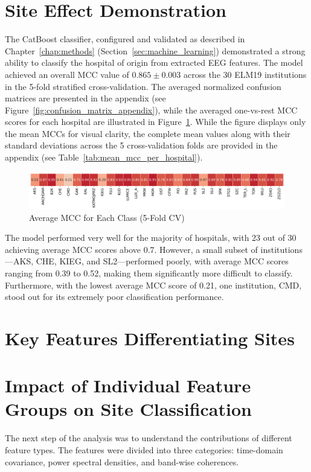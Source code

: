 \documentclass{bachelor2025eng}
\begin{document}
    \section{Site Effect Demonstration}
        The CatBoost classifier, configured and validated as described in Chapter~\ref{chap:methods} (Section~\ref{sec:machine_learning}) demonstrated a strong ability to classify the hospital of origin from extracted EEG features. The model achieved an overall MCC value of \({0.865 \pm 0.003}\) across the 30 ELM19 institutions in the 5-fold stratified cross-validation. The averaged normalized confusion matrices are presented in the appendix (see Figure~\ref{fig:confusion_matrix_appendix}), while the averaged one-vs-rest MCC scores for each hospital are illustrated in Figure~\ref{fig:hospital_classification_mcc_all_features}. While the figure displays only the mean MCCs for visual clarity, the complete mean values along with their standard deviations across the 5 cross-validation folds are provided in the appendix (see Table~\ref{tab:mean_mcc_per_hospital}).

        \begin{figure}[htbp]
        \centering
        \includegraphics[width=\textwidth]{results/hospital_classification_avg_mcc_per_class.png}
        \caption{Average MCC for Each Class (5-Fold CV)}
        \label{fig:hospital_classification_mcc_all_features}
        \end{figure}

        The model performed very well for the majority of hospitals, with 23 out of 30 achieving average MCC scores above 0.7. However, a small subset of institutions—AKS, CHE, KIEG, and SL2—performed poorly, with average MCC scores ranging from 0.39 to 0.52, making them significantly more difficult to classify. Furthermore, with the lowest average MCC score of 0.21, one institution, CMD, stood out for its extremely poor classification performance.

    \section{Key Features Differentiating Sites}
        
    \section{Impact of Individual Feature Groups on Site Classification}        
        The next step of the analysis was to understand the contributions of different feature types. The features were divided into three categories: time-domain covariance, power spectral densities, and band-wise coherences. 
\end{document}
